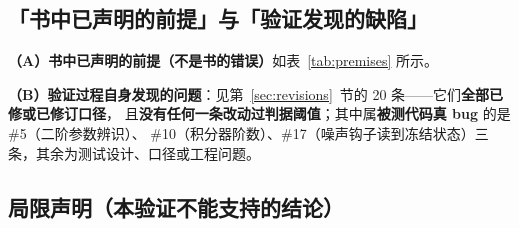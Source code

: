 \documentclass[11pt,a4paper]{ctexart}
\begin{document}
\subsection{「书中已声明的前提」与「验证发现的缺陷」}\label{sec:premises}

\textbf{（A）书中已声明的前提（不是书的错误）}如表~\ref{tab:premises} 所示。

\begin{table}[H]
\centering
\small
\setlength{\tabcolsep}{4pt}
\caption{书中已声明的前提及其在验证中的表现}\label{tab:premises}
\end{table}

\textbf{（B）验证过程自身发现的问题}：见第~\ref{sec:revisions}~节的 20 条——它们\textbf{全部已修或已修订口径}，
且\textbf{没有任何一条改动过判据阈值}；其中属\textbf{被测代码真 bug} 的是 \#5（二阶参数辨识）、
\#10（积分器阶数）、\#17（噪声钩子读到冻结状态）三条，其余为测试设计、口径或工程问题。

\subsection{局限声明（本验证不能支持的结论）}
\end{document}
